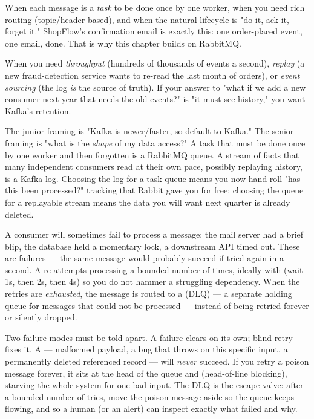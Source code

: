  When each message is a \emph{task} to be done once by one worker, when you need rich routing (topic/header-based), and when the natural lifecycle is "do it, ack it, forget it." ShopFlow's confirmation email is exactly this: one order-placed event, one email, done. That is why this chapter builds on RabbitMQ.

 When you need \emph{throughput} (hundreds of thousands of events a second), \emph{replay} (a new fraud-detection service wants to re-read the last month of orders), or \emph{event sourcing} (the log \emph{is} the source of truth). If your answer to "what if we add a new consumer next year that needs the old events?" is "it must see history," you want Kafka's retention.

\begin{seniornote}
The junior framing is "Kafka is newer/faster, so default to Kafka." The senior framing is "what is the \emph{shape} of my data access?" A task that must be done once by one worker and then forgotten is a RabbitMQ queue. A stream of facts that many independent consumers read at their own pace, possibly replaying history, is a Kafka log. Choosing the log for a task queue means you now hand-roll "has this been processed?" tracking that Rabbit gave you for free; choosing the queue for a replayable stream means the data you will want next quarter is already deleted.
\end{seniornote}


 A consumer will sometimes fail to process a message: the mail server had a brief blip, the database held a momentary lock, a downstream API timed out. These are  failures --- the same message would probably succeed if tried again in a second. A  re-attempts processing a bounded number of times, ideally with  (wait 1s, then 2s, then 4s) so you do not hammer a struggling dependency. When the retries are \emph{exhausted}, the message is routed to a  (DLQ) --- a separate holding queue for messages that could not be processed --- instead of being retried forever or silently dropped.

 Two failure modes must be told apart. A  failure clears on its own; blind retry fixes it. A  --- malformed payload, a bug that throws on this specific input, a permanently deleted referenced record --- will \emph{never} succeed. If you retry a poison message forever, it sits at the head of the queue and  (head-of-line blocking), starving the whole system for one bad input. The DLQ is the escape valve: after a bounded number of tries, move the poison message aside so the queue keeps flowing, and so a human (or an alert) can inspect exactly what failed and why.

